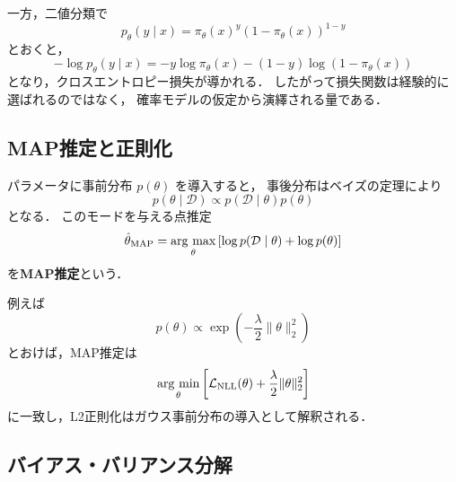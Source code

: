 一方，二値分類で
\begin{equation}
  p_{\theta}(y \mid x)
  =
  \pi_{\theta}(x)^{y}
  \left(
    1-\pi_{\theta}(x)
  \right)^{1-y}
  \label{eq:bernoulli-classification}
\end{equation}
とおくと，
\begin{equation}
  -\log p_{\theta}(y \mid x)
  =
  -y\log \pi_{\theta}(x)
  -(1-y)\log\left(1-\pi_{\theta}(x)\right)
  \label{eq:bce}
\end{equation}
となり，クロスエントロピー損失が導かれる．
したがって損失関数は経験的に選ばれるのではなく，
確率モデルの仮定から演繹される量である．

\subsection{MAP推定と正則化}

パラメータに事前分布 $p(\theta)$ を導入すると，
事後分布はベイズの定理により
\begin{equation}
  p(\theta \mid \mathcal{D})
  \propto
  p(\mathcal{D} \mid \theta)p(\theta)
  \label{eq:posterior}
\end{equation}
となる．
このモードを与える点推定
\begin{equation}
  \hat{\theta}_{\mathrm{MAP}}
  =
  \mathop{\rm arg~max}\limits_{\theta}
  \left[
    \log p(\mathcal{D}\mid \theta) + \log p(\theta)
  \right]
  \label{eq:map}
\end{equation}
を\textbf{MAP推定}という．

例えば
\begin{equation}
  p(\theta)
  \propto
  \exp\left(
    -\frac{\lambda}{2}\|\theta\|_{2}^{2}
  \right)
  \label{eq:gaussian-prior}
\end{equation}
とおけば，MAP推定は
\begin{equation}
  \mathop{\rm arg~min}\limits_{\theta}
  \left[
    \mathcal{L}_{\mathrm{NLL}}(\theta)
    + \frac{\lambda}{2}\|\theta\|_{2}^{2}
  \right]
  \label{eq:l2-regularization}
\end{equation}
に一致し，L2正則化はガウス事前分布の導入として解釈される．

\subsection{バイアス・バリアンス分解}


